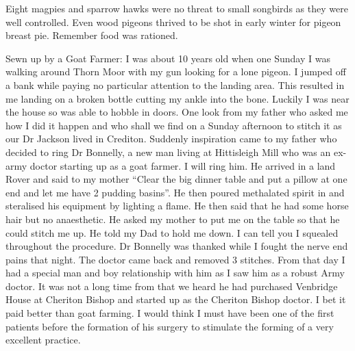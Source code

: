 Eight magpies and sparrow hawks were no threat to small songbirds as they were
well controlled. Even wood pigeons thrived to be shot in early winter for
pigeon breast pie. Remember food was rationed.






Sewn up by a Goat Farmer: I was about 10 years old when one Sunday I was
walking around Thorn Moor with my gun looking for a lone pigeon. I jumped off
a bank while paying no particular attention to the landing area. This resulted
in me landing on a broken bottle cutting my ankle into the bone. Luckily I was
near the house so was able to hobble in doors. One look from my father who
asked me how I did it happen and who shall we find on a Sunday afternoon to
stitch it as our Dr Jackson lived in Crediton. Suddenly inspiration came to my
father who decided to ring Dr Bonnelly, a new man living at Hittisleigh Mill
who was an ex-army doctor starting up as a goat farmer. I will ring him. He
arrived in a land Rover and said to my mother ``Clear the big dinner table and
put a pillow at one end and let me have 2 pudding basins''. He then poured
methalated spirit in and steralised his equipment by lighting a flame. He then
said that he had some horse hair but no anaesthetic. He asked my mother to put
me on the table so that he could stitch me up. He told my Dad to hold me down.
I can tell you I squealed throughout the procedure. Dr Bonnelly was thanked
while I fought the nerve end pains that night. The doctor came back and
removed 3 stitches. From that day I had a special man and boy relationship
with him as I saw him as a robust Army doctor. It was not a long time from
that we heard he had purchased Venbridge House at Cheriton Bishop and started
up as the Cheriton Bishop doctor. I bet it paid better than goat farming. I
would think I must have been one of the first patients before the formation of
his surgery to stimulate the forming of a very excellent practice.





